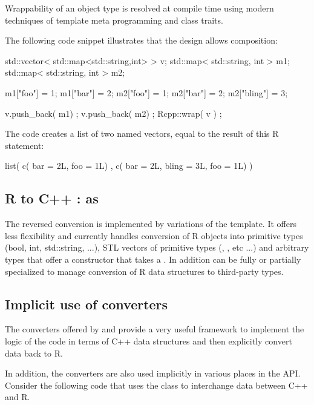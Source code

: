 Wrappability of an object type is resolved at compile time using 
modern techniques of template meta programming and class traits.

The following code snippet illustrates that the design allows
composition:

\begin{example}
std::vector< std::map<std::string,int> > v;
std::map< std::string, int > m1;
std::map< std::string, int > m2;

m1["foo"] = 1; m1["bar"] = 2;
m2["foo"] = 1; m2["bar"] = 2; m2["bling"] = 3;

v.push_back( m1) ;
v.push_back( m2) ;
Rcpp::wrap( v ) ;
\end{example}

The code creates a list of two named vectors, equal to the 
result of this R statement:

\begin{example}
list( c( bar = 2L, foo = 1L) , 
      c( bar = 2L, bling = 3L, foo = 1L) )
\end{example}

\subsection{R to C++ : as}

The reversed conversion is implemented by variations of the 
 template. It offers less flexibility and currently
handles conversion of R objects into primitive types (bool, int, std::string, ...), 
STL vectors of primitive types  (, 
, etc ...) and arbitrary types that offer 
a constructor that takes a . In addition  can 
be fully or partially specialized to manage conversion of R data 
structures to third-party types.

\subsection{Implicit use of converters}

The converters offered by  and  provide a very 
useful framework to implement the logic of the code in terms of C++ 
data structures and then explicitly convert data back to R. 

In addition, the converters are also used implicitly
in various places in the  API. 
Consider the following code that uses the  class to 
interchange data between C++ and R.

